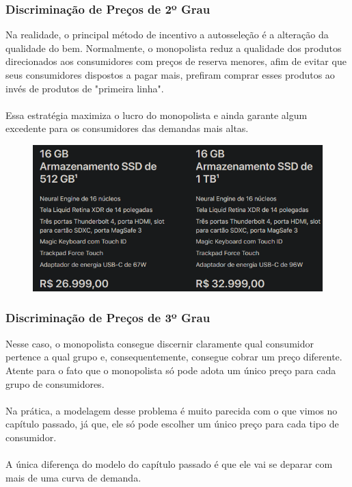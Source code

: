 \documentclass{beamer}[10]
\begin{document}
\begin{frame}
	\frametitle{Discriminação de Preços de 2º Grau}

	Na realidade, o principal método de incentivo a autosseleção é a alteração da qualidade do bem. Normalmente, o monopolista reduz a qualidade dos produtos direcionados aos consumidores com preços de reserva menores, afim de evitar que seus consumidores dispostos a pagar mais, prefiram comprar esses produtos ao invés de produtos de "primeira linha".
	\\~\\
	Essa estratégia maximiza o lucro do monopolista e ainda garante algum excedente para os consumidores das demandas mais altas.

	\begin{figure}[H]
		\centering
		\includegraphics[scale=0.3]{cap26_3-discriminacao_grau2_4.png}
	\end{figure}

\end{frame}


\begin{frame}
	\frametitle{Discriminação de Preços de 3º Grau}

	Nesse caso, o monopolista consegue discernir claramente qual consumidor pertence a qual grupo e, consequentemente, consegue cobrar um preço diferente. Atente para o fato que o monopolista só pode adota um único preço para cada grupo de consumidores.
	\\~\\
	Na prática, a modelagem desse problema é muito parecida com o que vimos no capítulo passado, já que, ele só pode escolher um único preço para cada tipo de consumidor.
	\\~\\
	A única diferença do modelo do capítulo passado é que ele vai se deparar com mais de uma curva de demanda.

\end{frame}
\end{document}
